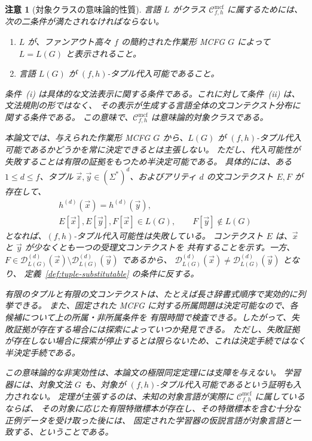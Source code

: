 \documentclass[11pt,a4paper]{ltjsarticle}
\newtheorem{remark}[theorem]{注意}
\theoremstyle{remark}
\newcommand{\Cmcf}[2]{\mathcal{C}^{\mathrm{mcf}}_{#1,#2}}
\newcommand{\D}{\mathcal{D}}
\newcommand{\tuple}[1]{\vec{#1}}
\begin{document}
\begin{remark}[対象クラスの意味論的性質]
\label{rem:semantic-class}
言語 \(L\) がクラス \(\Cmcf{f}{h}\) に属するためには、次の二条件が満たされなければならない。
\begin{enumerate}[label=(\roman*),leftmargin=*]
\item \(L\) が、ファンアウト高々 \(f\) の簡約された作業形 MCFG \(G\) によって
      \(L=L(G)\) と表示されること。
\item 言語 \(L(G)\) が \((f,h)\)-タプル代入可能であること。
\end{enumerate}
条件~(i) は具体的な文法表示に関する条件である。これに対して条件~(ii) は、文法規則の形ではなく、
その表示が生成する言語全体の文コンテクスト分布に関する条件である。
この意味で、\(\Cmcf{f}{h}\) は\emph{意味論的対象クラス}である。

本論文では、与えられた作業形 MCFG \(G\) から、\(L(G)\) が
\((f,h)\)-タプル代入可能であるかどうかを常に決定できるとは主張しない。
ただし、代入可能性が\emph{失敗すること}は有限の証拠をもつため半決定可能である。
具体的には、ある \(1\le d\le f\)、タプル
\(\tuple x,\tuple y\in(\Sigma^*)^d\)、およびアリティ \(d\) の文コンテクスト
\(E,F\) が存在して、
\[
\begin{gathered}
  h^{(d)}(\tuple x)=h^{(d)}(\tuple y),\\
  E[\tuple x],E[\tuple y],F[\tuple x]\in L(G),
  \qquad F[\tuple y]\notin L(G)
\end{gathered}
\]
となれば、\((f,h)\)-タプル代入可能性は失敗している。
コンテクスト \(E\) は、\(\tuple x\) と \(\tuple y\) が少なくとも一つの受理文コンテクストを
共有することを示す。一方、\(F\in\D_{L(G)}^{(d)}(\tuple x)\setminus
\D_{L(G)}^{(d)}(\tuple y)\) であるから、
\(\D_{L(G)}^{(d)}(\tuple x)\ne\D_{L(G)}^{(d)}(\tuple y)\) となり、
定義~\ref{def:tuple-substitutable} の条件に反する。

有限のタプルと有限の文コンテクストは、たとえば長さ辞書式順序で実効的に列挙できる。
また、固定された MCFG に対する所属問題は決定可能なので、各候補について上の所属・非所属条件を
有限時間で検査できる。したがって、失敗証拠が存在する場合には探索によっていつか発見できる。
ただし、失敗証拠が存在しない場合に探索が停止するとは限らないため、これは決定手続ではなく
半決定手続である。

この意味論的な非実効性は、本論文の極限同定定理には支障を与えない。
学習器には、対象文法 \(G\) も、対象が \((f,h)\)-タプル代入可能であるという証明も入力されない。
定理が主張するのは、未知の対象言語が実際に \(\Cmcf{f}{h}\) に属しているならば、
その対象に応じた有限特徴標本が存在し、その特徴標本を含む十分な正例データを受け取った後には、
固定された学習器の仮説言語が対象言語と一致する、ということである。


\end{remark}
\end{document}
